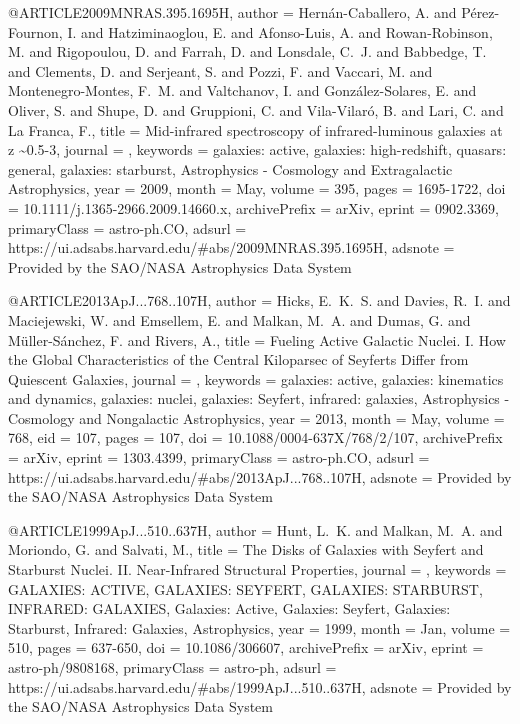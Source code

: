 \documentclass[longauth]{aa}
\begin{document}
{@ARTICLE{2009MNRAS.395.1695H,
       author = {{Hern{\'a}n-Caballero}, A. and {P{\'e}rez-Fournon}, I. and {Hatziminaoglou}, E. and {Afonso-Luis}, A. and {Rowan-Robinson}, M. and {Rigopoulou}, D. and {Farrah}, D. and {Lonsdale}, C.~J. and {Babbedge}, T. and {Clements}, D. and {Serjeant}, S. and {Pozzi}, F. and {Vaccari}, M. and {Montenegro-Montes}, F.~M. and {Valtchanov}, I. and {Gonz{\'a}lez-Solares}, E. and {Oliver}, S. and {Shupe}, D. and {Gruppioni}, C. and {Vila-Vilar{\'o}}, B. and {Lari}, C. and {La Franca}, F.},
        title = {Mid-infrared spectroscopy of infrared-luminous galaxies at z \textasciitilde 0.5-3},
      journal = {\mnras},
     keywords = {galaxies: active, galaxies: high-redshift, quasars: general, galaxies: starburst, Astrophysics - Cosmology and Extragalactic Astrophysics},
         year = 2009,
        month = May,
       volume = {395},
        pages = {1695-1722},
          doi = {10.1111/j.1365-2966.2009.14660.x},
archivePrefix = {arXiv},
       eprint = {0902.3369},
 primaryClass = {astro-ph.CO},
       adsurl = {https://ui.adsabs.harvard.edu/#abs/2009MNRAS.395.1695H},
      adsnote = {Provided by the SAO/NASA Astrophysics Data System}
}

@ARTICLE{2013ApJ...768..107H,
       author = {{Hicks}, E.~K.~S. and {Davies}, R.~I. and {Maciejewski}, W. and {Emsellem}, E. and {Malkan}, M.~A. and {Dumas}, G. and {M{\"u}ller-S{\'a}nchez}, F. and {Rivers}, A.},
       title = {Fueling Active Galactic Nuclei. I. How the Global Characteristics of the Central Kiloparsec of Seyferts Differ from Quiescent Galaxies},
      journal = {\apj},
     keywords = {galaxies: active, galaxies: kinematics and dynamics, galaxies: nuclei, galaxies: Seyfert, infrared: galaxies, Astrophysics - Cosmology and Nongalactic Astrophysics},
         year = 2013,
        month = May,
       volume = {768},
          eid = {107},
        pages = {107},
          doi = {10.1088/0004-637X/768/2/107},
archivePrefix = {arXiv},
       eprint = {1303.4399},
 primaryClass = {astro-ph.CO},
       adsurl = {https://ui.adsabs.harvard.edu/#abs/2013ApJ...768..107H},
      adsnote = {Provided by the SAO/NASA Astrophysics Data System}
}

@ARTICLE{1999ApJ...510..637H,
       author = {{Hunt}, L.~K. and {Malkan}, M.~A. and {Moriondo}, G. and {Salvati}, M.},
        title = {The Disks of Galaxies with Seyfert and Starburst Nuclei. II. Near-Infrared Structural Properties},
      journal = {\apj},
     keywords = {GALAXIES: ACTIVE, GALAXIES: SEYFERT, GALAXIES: STARBURST, INFRARED: GALAXIES, Galaxies: Active, Galaxies: Seyfert, Galaxies: Starburst, Infrared: Galaxies, Astrophysics},
         year = 1999,
        month = Jan,
       volume = {510},
        pages = {637-650},
          doi = {10.1086/306607},
archivePrefix = {arXiv},
       eprint = {astro-ph/9808168},
 primaryClass = {astro-ph},
       adsurl = {https://ui.adsabs.harvard.edu/#abs/1999ApJ...510..637H},
      adsnote = {Provided by the SAO/NASA Astrophysics Data System}
}

}
\end{document}
